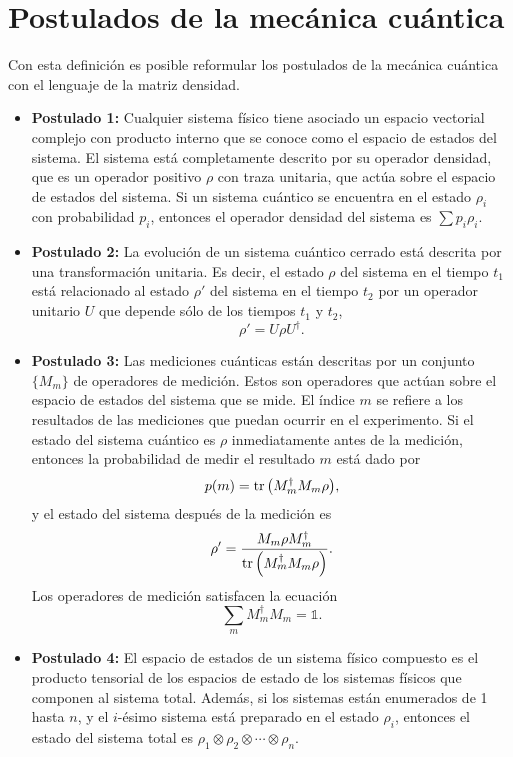 \documentclass[12pt]{report}
\begin{document}
\section{Postulados de la mecánica cuántica}
Con esta definición es posible reformular los postulados de la mecánica cuántica con el lenguaje de 
la matriz densidad. 
\begin{itemize}
	\item \textbf{Postulado 1:} Cualquier sistema físico tiene asociado un espacio vectorial complejo
	con producto interno que se conoce como el espacio de estados del
	sistema. El sistema está completamente descrito por su operador densidad,
	que es un operador positivo $\rho$ con traza unitaria, que actúa sobre 
	el espacio de estados del sistema. Si un sistema cuántico se encuentra
	en el estado $\rho _i$ con probabilidad $p_i$, entonces el operador densidad
	del sistema es $\sum p_i\rho_i$.
	\item \textbf{Postulado 2:} La evolución de un sistema cuántico cerrado está descrita por una transformación
	unitaria. Es decir, el estado $\rho$ del sistema en el tiempo $t_1$ está 
	relacionado al estado $\rho'$ del sistema en el tiempo $t_2$ por un operador
	unitario $U$ que depende sólo de los tiempos $t_1$ y $t_2$,
	\begin{equation}
	\rho'=U\rho U^{\dagger}.
	\label{eq:postulate1}
	\end{equation}
	\item \textbf{Postulado 3:} Las mediciones cuánticas están descritas por un conjunto $\{M_m\}$ de 
	operadores de medición. Estos son operadores que actúan sobre el espacio 
	de estados del sistema que se mide. El índice $m$ se refiere a los resultados
	de las mediciones que puedan ocurrir en el experimento. Si el estado del sistema
	cuántico es $\rho$ inmediatamente antes de la medición, entonces la probabilidad
	de medir el resultado $m$ está dado por
	\begin{equation}
	p(m)=\tr \qty(M_m^{\dagger}M_m\rho),
	\label{eq:postulate2_prob}
	\end{equation}						
	y el estado del sistema después de la medición es
	\begin{equation}
	\rho'=\frac{M_m\rho M_m^{\dagger}}{\tr \qty(M_m^{\dagger}M_m\rho)}.
	\label{eq:postulate2_rhoPrime}
	\end{equation}	
	Los operadores de medición satisfacen la ecuación 
	\begin{equation}
	\sum _m M_m^{\dagger}M_m=\mathbb{1}.
	\label{eq:postulate2_completeness}
	\end{equation}
	\item \textbf{Postulado 4:} El espacio de estados de un sistema físico compuesto es el producto tensorial 
	de los espacios de estado de los sistemas físicos que componen al sistema total.
	Además, si los sistemas están enumerados de 1 hasta $n$, y el $i$-ésimo sistema
	está preparado en el estado $\rho_i$, entonces el estado del sistema total es
	$\rho_1\otimes\rho_2\otimes\cdots\otimes\rho_n$.
\end{itemize}
\end{document}
